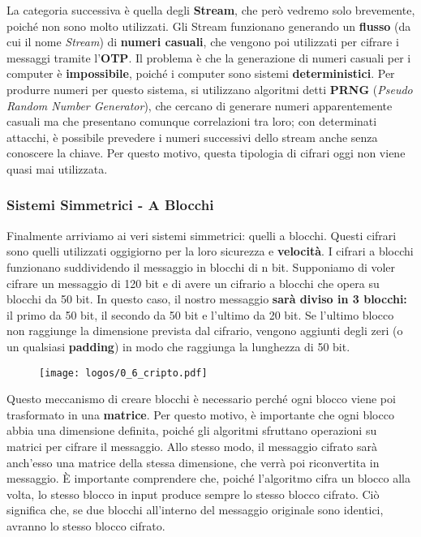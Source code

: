 \documentclass{report}
\begin{document}
La categoria successiva è quella degli \textbf{Stream}, che però vedremo solo brevemente, poiché non sono molto utilizzati. Gli Stream funzionano generando un \textbf{flusso} (da cui il nome \textit{Stream}) di \textbf{numeri casuali}, che vengono poi utilizzati per cifrare i messaggi tramite l’\textbf{OTP}. Il problema è che la generazione di numeri casuali per i computer è \textbf{impossibile}, poiché i computer sono sistemi \textbf{deterministici}. Per produrre numeri per questo sistema, si utilizzano algoritmi detti \textbf{PRNG} (\textit{Pseudo Random Number Generator}), che cercano di generare numeri apparentemente casuali ma che presentano comunque correlazioni tra loro; con determinati attacchi, è possibile prevedere i numeri successivi dello stream anche senza conoscere la chiave. Per questo motivo, questa tipologia di cifrari oggi non viene quasi mai utilizzata.


\newpage
\subsubsection{Sistemi Simmetrici - A Blocchi}

Finalmente arriviamo ai veri sistemi simmetrici: quelli a blocchi. Questi cifrari sono quelli utilizzati oggigiorno per la loro sicurezza e \textbf{velocità}. I cifrari a blocchi funzionano suddividendo il messaggio in blocchi di n bit. Supponiamo di voler cifrare un messaggio di 120 bit e di avere un cifrario a blocchi che opera su blocchi da 50 bit. In questo caso, il nostro messaggio \textbf{sarà diviso in 3 blocchi:} il primo da 50 bit, il secondo da 50 bit e l’ultimo da 20 bit. Se l’ultimo blocco non raggiunge la dimensione prevista dal cifrario, vengono aggiunti degli zeri (o un qualsiasi \textbf{padding}) in modo che raggiunga la lunghezza di 50 bit.


\begin{figure}[h]
    \centering
    \texttt{[image: logos/0\_6\_cripto.pdf]}
\end{figure}



Questo meccanismo di creare blocchi è necessario perché ogni blocco viene poi trasformato in una \textbf{matrice}. Per questo motivo, è importante che ogni blocco abbia una dimensione definita, poiché gli algoritmi sfruttano operazioni su matrici per cifrare il messaggio. Allo stesso modo, il messaggio cifrato sarà anch’esso una matrice della stessa dimensione, che verrà poi riconvertita in messaggio. È importante comprendere che, poiché l’algoritmo cifra un blocco alla volta, lo stesso blocco in input produce sempre lo stesso blocco cifrato. Ciò significa che, se due blocchi all’interno del messaggio originale sono identici, avranno lo stesso blocco cifrato.
\end{document}
